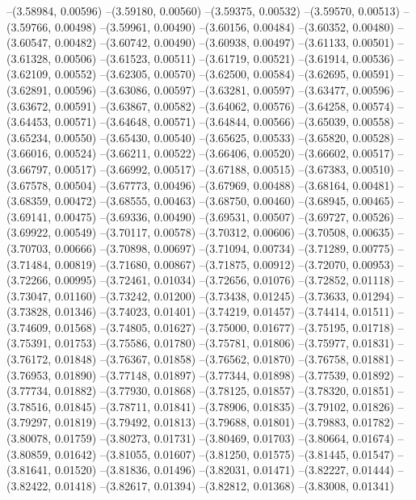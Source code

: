 --(3.58984, 0.00596)
--(3.59180, 0.00560)
--(3.59375, 0.00532)
--(3.59570, 0.00513)
--(3.59766, 0.00498)
--(3.59961, 0.00490)
--(3.60156, 0.00484)
--(3.60352, 0.00480)
--(3.60547, 0.00482)
--(3.60742, 0.00490)
--(3.60938, 0.00497)
--(3.61133, 0.00501)
--(3.61328, 0.00506)
--(3.61523, 0.00511)
--(3.61719, 0.00521)
--(3.61914, 0.00536)
--(3.62109, 0.00552)
--(3.62305, 0.00570)
--(3.62500, 0.00584)
--(3.62695, 0.00591)
--(3.62891, 0.00596)
--(3.63086, 0.00597)
--(3.63281, 0.00597)
--(3.63477, 0.00596)
--(3.63672, 0.00591)
--(3.63867, 0.00582)
--(3.64062, 0.00576)
--(3.64258, 0.00574)
--(3.64453, 0.00571)
--(3.64648, 0.00571)
--(3.64844, 0.00566)
--(3.65039, 0.00558)
--(3.65234, 0.00550)
--(3.65430, 0.00540)
--(3.65625, 0.00533)
--(3.65820, 0.00528)
--(3.66016, 0.00524)
--(3.66211, 0.00522)
--(3.66406, 0.00520)
--(3.66602, 0.00517)
--(3.66797, 0.00517)
--(3.66992, 0.00517)
--(3.67188, 0.00515)
--(3.67383, 0.00510)
--(3.67578, 0.00504)
--(3.67773, 0.00496)
--(3.67969, 0.00488)
--(3.68164, 0.00481)
--(3.68359, 0.00472)
--(3.68555, 0.00463)
--(3.68750, 0.00460)
--(3.68945, 0.00465)
--(3.69141, 0.00475)
--(3.69336, 0.00490)
--(3.69531, 0.00507)
--(3.69727, 0.00526)
--(3.69922, 0.00549)
--(3.70117, 0.00578)
--(3.70312, 0.00606)
--(3.70508, 0.00635)
--(3.70703, 0.00666)
--(3.70898, 0.00697)
--(3.71094, 0.00734)
--(3.71289, 0.00775)
--(3.71484, 0.00819)
--(3.71680, 0.00867)
--(3.71875, 0.00912)
--(3.72070, 0.00953)
--(3.72266, 0.00995)
--(3.72461, 0.01034)
--(3.72656, 0.01076)
--(3.72852, 0.01118)
--(3.73047, 0.01160)
--(3.73242, 0.01200)
--(3.73438, 0.01245)
--(3.73633, 0.01294)
--(3.73828, 0.01346)
--(3.74023, 0.01401)
--(3.74219, 0.01457)
--(3.74414, 0.01511)
--(3.74609, 0.01568)
--(3.74805, 0.01627)
--(3.75000, 0.01677)
--(3.75195, 0.01718)
--(3.75391, 0.01753)
--(3.75586, 0.01780)
--(3.75781, 0.01806)
--(3.75977, 0.01831)
--(3.76172, 0.01848)
--(3.76367, 0.01858)
--(3.76562, 0.01870)
--(3.76758, 0.01881)
--(3.76953, 0.01890)
--(3.77148, 0.01897)
--(3.77344, 0.01898)
--(3.77539, 0.01892)
--(3.77734, 0.01882)
--(3.77930, 0.01868)
--(3.78125, 0.01857)
--(3.78320, 0.01851)
--(3.78516, 0.01845)
--(3.78711, 0.01841)
--(3.78906, 0.01835)
--(3.79102, 0.01826)
--(3.79297, 0.01819)
--(3.79492, 0.01813)
--(3.79688, 0.01801)
--(3.79883, 0.01782)
--(3.80078, 0.01759)
--(3.80273, 0.01731)
--(3.80469, 0.01703)
--(3.80664, 0.01674)
--(3.80859, 0.01642)
--(3.81055, 0.01607)
--(3.81250, 0.01575)
--(3.81445, 0.01547)
--(3.81641, 0.01520)
--(3.81836, 0.01496)
--(3.82031, 0.01471)
--(3.82227, 0.01444)
--(3.82422, 0.01418)
--(3.82617, 0.01394)
--(3.82812, 0.01368)
--(3.83008, 0.01341)
